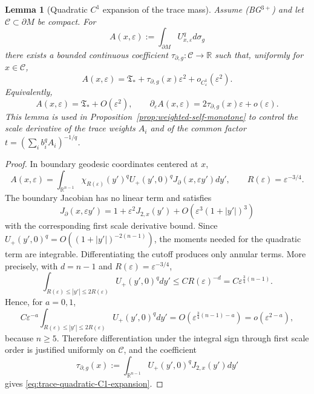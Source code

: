 \documentclass[11pt,reqno,a4paper]{amsart}
\newcommand{\R}{\mathbb{R}}
\numberwithin{equation}{section}
\theoremstyle{plain}
\newtheorem{lemma}[theorem]{Lemma}
\theoremstyle{remark}
\theoremstyle{plain}
\begin{document}
\begin{lemma}[Quadratic $C^1$ expansion of the trace mass]
\label{lem:trace-quadratic-C1}
Assume \textup{(BG$^{3+}$)} and let $\mathcal C\subset\partial M$ be compact.
For
\[
A(x,\varepsilon):=\int_{\partial M}U_{x,\varepsilon}^{q}d\sigma_g
\]
there exists a bounded continuous coefficient $\tau_{\partial,g}:\mathcal C\to\R$
such that, uniformly for $x\in\mathcal C$,
\begin{equation}\label{eq:trace-quadratic-C1-expansion}
A(x,\varepsilon)
=\mathfrak T_\ast+\tau_{\partial,g}(x)\varepsilon^2+o_{C^1_\varepsilon}(\varepsilon^2).
\end{equation}
Equivalently,
\[
A(x,\varepsilon)=\mathfrak T_\ast+O(\varepsilon^2),
\qquad
\partial_\varepsilon A(x,\varepsilon)=2\tau_{\partial,g}(x)\varepsilon+o(\varepsilon).
\]
This lemma is used in Proposition~\ref{prop:weighted-self-monotone} to control the
scale derivative of the trace weights $A_i$ and of the common factor
$t=(\sum_i b_i^qA_i)^{-1/q}$.
\end{lemma}

\begin{proof}
In boundary geodesic coordinates centered at $x$,
\[
A(x,\varepsilon)
=\int_{\R^{n-1}}\chi_{R(\varepsilon)}(y')^qU_+(y',0)^q
J_\partial(x,\varepsilon y')dy',
\qquad R(\varepsilon)=\varepsilon^{-3/4}.
\]
The boundary Jacobian has no linear term and satisfies
\[
J_\partial(x,\varepsilon y')
=1+\varepsilon^2J_{2,x}(y')+O(\varepsilon^3(1+|y'|)^3)
\]
with the corresponding first scale derivative bound.  Since
$U_+(y',0)^q=O((1+|y'|)^{-2(n-1)})$, the moments needed for the quadratic term are
integrable.  Differentiating the cutoff produces only annular terms.  More
precisely, with $d=n-1$ and $R(\varepsilon)=\varepsilon^{-3/4}$,
\[
\int_{R(\varepsilon)\le |y'|\le2R(\varepsilon)}U_+(y',0)^qdy'
\le
C R(\varepsilon)^{-d}
=
C\varepsilon^{\frac34(n-1)}.
\]
Hence, for $a=0,1$,
\[
C\varepsilon^{-a}\int_{R(\varepsilon)\le |y'|\le2R(\varepsilon)}
U_+(y',0)^qdy'
=
O\left(\varepsilon^{\frac34(n-1)-a}\right)
=
o(\varepsilon^{2-a}),
\]
because $n\ge5$.  Therefore differentiation under the integral sign through first
scale order is justified uniformly on $\mathcal C$, and the coefficient
\[
\tau_{\partial,g}(x):=\int_{\R^{n-1}}U_+(y',0)^qJ_{2,x}(y')dy'
\]
gives \eqref{eq:trace-quadratic-C1-expansion}.
\end{proof}
\end{document}
